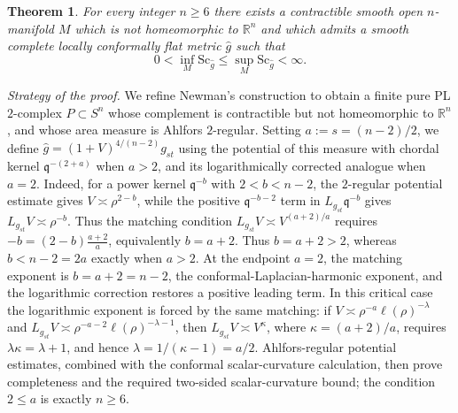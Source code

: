 \documentclass[12pt,oneside,a4paper]{article}
\theoremstyle{mytheorem}
\newtheorem{theorem}[definition]{Theorem}
\theoremstyle{remark}
\theoremstyle{definition}
\begin{document}
\begin{theorem}\label{thm:uniform-psc-counterexample}
For every integer $n\geq 6$ there exists a contractible smooth open
$n$-manifold $M$ which is not homeomorphic to $\mathbb R^n$ and which
admits a smooth complete locally conformally flat metric
$\widehat g$ such that
\[
  0<\inf_M\mathrm{Sc}_{\widehat g}
  \le \sup_M\mathrm{Sc}_{\widehat g}<\infty.
\]
\end{theorem}


\medskip
\noindent\textit{Strategy of the proof.}
We refine Newman's construction to obtain a finite pure PL
$2$-complex $P\subset S^n$ whose complement is contractible but not
homeomorphic to $\mathbb R^n$, and whose area measure is Ahlfors
$2$-regular.  Setting $a:=s=(n-2)/2$, we define
$\widehat g=(1+V)^{4/(n-2)}g_{st}$ using the potential of this measure
with chordal kernel $\mathfrak q^{-(2+a)}$ when $a>2$, and its logarithmically
corrected analogue when $a=2$.  Indeed, for a power kernel $\mathfrak q^{-b}$
with $2<b<n-2$, the $2$-regular potential estimate gives
$V\asymp\rho^{2-b}$, while the positive $\mathfrak q^{-b-2}$ term in
$L_{g_{st}}\mathfrak q^{-b}$ gives $L_{g_{st}}V\asymp\rho^{-b}$.  Thus the
matching condition
\(L_{g_{st}}V\asymp V^{(a+2)/a}\)
requires
\(-b=(2-b)\frac{a+2}{a}\),
equivalently \(b=a+2\).
Thus $b=a+2>2$, whereas $b<n-2=2a$ exactly when $a>2$.  At the
endpoint $a=2$, the matching exponent is $b=a+2=n-2$, the
conformal-Laplacian-harmonic exponent, and the logarithmic
correction restores a positive leading term.  In this critical case the
logarithmic exponent is forced by the same matching: if
$V\asymp\rho^{-a}\ell(\rho)^{-\lambda}$ and
$L_{g_{st}}V\asymp\rho^{-a-2}\ell(\rho)^{-\lambda-1}$, then
$L_{g_{st}}V\asymp V^\kappa$, where \(\kappa=(a+2)/a\), requires
$\lambda\kappa=\lambda+1$, and hence
$\lambda=1/(\kappa-1)=a/2$.
Ahlfors-regular potential estimates, combined with the conformal
scalar-curvature calculation,
then prove completeness and the required two-sided scalar-curvature
bound; the condition $2\leq a$ is exactly $n\geq 6$.
\end{document}
